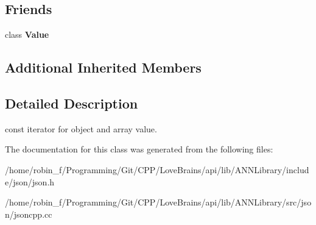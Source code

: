 \subsection*{Friends}
\begin{DoxyCompactItemize}
\item 
\hypertarget{class_json_1_1_value_const_iterator_aeceedf6e1a7d48a588516ce2b1983d6f}{}class {\bfseries Value}\label{class_json_1_1_value_const_iterator_aeceedf6e1a7d48a588516ce2b1983d6f}

\end{DoxyCompactItemize}
\subsection*{Additional Inherited Members}


\subsection{Detailed Description}
const iterator for object and array value. 



The documentation for this class was generated from the following files\+:\begin{DoxyCompactItemize}
\item 
/home/robin\+\_\+f/\+Programming/\+Git/\+C\+P\+P/\+Love\+Brains/api/lib/\+A\+N\+N\+Library/include/json/json.\+h\item 
/home/robin\+\_\+f/\+Programming/\+Git/\+C\+P\+P/\+Love\+Brains/api/lib/\+A\+N\+N\+Library/src/json/jsoncpp.\+cc\end{DoxyCompactItemize}
